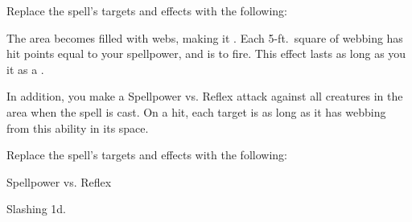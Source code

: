 


Replace the spell's targets and effects with the following:
\begin{spellcontent}

\begin{augmenttargetinginfo}




\end{augmenttargetinginfo}


\begin{augmenteffects}



\spelleffect
The area becomes filled with webs, making it .
Each 5-ft.\ square of webbing has hit points equal to your spellpower, and is  to fire.
This effect lasts as long as you  it as a .

In addition, you make a Spellpower vs. Reflex attack against all creatures in the area when the spell is cast.
On a hit, each target is \immobilized as long as it has webbing from this ability in its space.








\end{augmenteffects}

\end{spellcontent}








Replace the spell's targets and effects with the following:
\begin{spellcontent}

\begin{augmenttargetinginfo}




\end{augmenttargetinginfo}


\begin{augmenteffects}




\begin{spellattack}{Spellpower vs. Reflex}


\spellsuccess Slashing  \minus1d.


\end{spellattack}





\end{augmenteffects}

\end{spellcontent}





